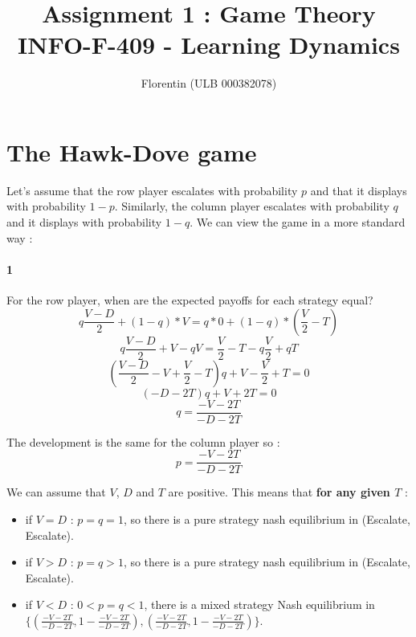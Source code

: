 \documentclass[a4paper]{article}
\title{
    Assignment 1 : Game Theory\\
    \small INFO-F-409 - Learning Dynamics
}
\author{Florentin \bsc{Hennecker} (ULB 000382078)}
\date{}
\begin{document}
\maketitle

\section{The Hawk-Dove game}
Let's assume that the row player escalates with probability $p$ and that it 
displays with probability $1-p$. Similarly, the column player escalates with 
probability $q$ and it displays with probability $1-q$. We can view the game
in a more standard way :


\paragraph{1} For the row player, when are the expected payoffs for each 
strategy equal?
$$ q\frac{V-D}{2} + (1-q)*V = q*0 + (1-q)*(\frac{V}{2}-T) $$
$$ q\frac{V-D}{2}+V-qV = \frac{V}{2}-T -q\frac{V}{2} + qT $$
$$ (\frac{V-D}{2} - V + \frac{V}{2} - T)q + V - \frac{V}{2} + T = 0 $$
$$ (-D-2T)q + V+2T = 0 $$
$$ q = \frac{-V-2T}{-D-2T} $$

The development is the same for the column player so :
$$ p = \frac{-V-2T}{-D-2T} $$

We can assume that $V$, $D$ and $T$ are positive. This means that \textbf{for
any given $T$} :
\begin{itemize}
	\item if $V = D$ : $p = q = 1$, so there is a pure 
		strategy nash equilibrium in (Escalate, Escalate).
	\item if $V > D$ : $ p = q > 1 $, so there is a pure
		strategy nash equilibrium in (Escalate,	Escalate).
	\item if $V < D$ : $ 0 < p = q < 1 $, there is a mixed strategy Nash
		equilibrium in \\
		$\{( \frac{-V-2T}{-D-2T}, 1-\frac{-V-2T}{-D-2T}), 
		( \frac{-V-2T}{-D-2T}, 1-\frac{-V-2T}{-D-2T})\}$. 
\end{itemize}
\end{document}
